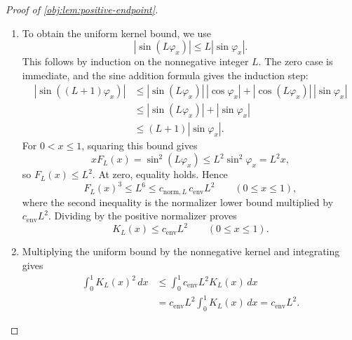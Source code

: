 \documentclass[11pt]{article}
\begin{document}
\begin{proof}[Proof of \cref{obj:lem:positive-endpoint}]
\begin{enumerate}
Define the endpoint-window width by
\[
\delta_{\mathrm{win},L}:=\frac{1}{16L^2}.
\]
For \(0<x\le\delta_{\mathrm{win},L}\), we have
\[
L\sqrt{x}\le\frac14.
\]
Using \(\sin v\ge(2/\pi)v\) for \(0\le v\le\pi/2\) at \(v=\varphi_x\), we obtain
\[
\frac{2}{\pi}L\varphi_x
\le L\sin\varphi_x
=L\sqrt{x}
\le\frac14.
\]
Thus \(0\le L\varphi_x\le\pi/2\), so the same sine inequality applies at \(L\varphi_x\). Together with \(\sin\varphi_x\le\varphi_x\), it yields
\[
\frac{2}{\pi}L\sin\varphi_x
\le\frac{2}{\pi}L\varphi_x
\le\sin(L\varphi_x).
\]
Squaring and using \(xF_L(x)=\sin^2(L\varphi_x)\), then dividing by \(x>0\), gives
\[
F_L(x)\ge\left(\frac{2}{\pi}\right)^2L^2.
\]
At \(x=0\), this inequality follows from \(F_L(0)=L^2\) and \(2/\pi\le1\). Therefore it holds throughout \([0,\delta_{\mathrm{win},L}]\). Since \(F_L^3\) is nonnegative on \([0,1]\),
\[
\begin{aligned}
c_{\mathrm{norm},L}
&\ge
\int_0^{\delta_{\mathrm{win},L}}F_L(t)^3\,dt\\
&\ge
\int_0^{\delta_{\mathrm{win},L}}
\left(\left(\frac{2}{\pi}\right)^2L^2\right)^3\,dt\\
&=
\frac{1}{16L^2}\frac{64L^6}{\pi^6}
=
\frac{4}{\pi^6}L^4.
\end{aligned}
\]

\item To obtain the uniform kernel bound, we use
\[
|\sin(L\varphi_x)|\le L|\sin\varphi_x|.
\]
This follows by induction on the nonnegative integer \(L\). The zero case is immediate, and the sine addition formula gives the induction step:
\[
\begin{aligned}
|\sin((L+1)\varphi_x)|
&\le
|\sin(L\varphi_x)|\,|\cos\varphi_x|
+
|\cos(L\varphi_x)|\,|\sin\varphi_x|\\
&\le
|\sin(L\varphi_x)|+|\sin\varphi_x|\\
&\le
(L+1)|\sin\varphi_x|.
\end{aligned}
\]
For \(0<x\le1\), squaring this bound gives
\[
xF_L(x)=\sin^2(L\varphi_x)
\le L^2\sin^2\varphi_x
=L^2x,
\]
so \(F_L(x)\le L^2\). At zero, equality holds. Hence
\[
F_L(x)^3\le L^6
\le c_{\mathrm{norm},L}\,c_{\mathrm{env}}L^2
\qquad(0\le x\le1),
\]
where the second inequality is the normalizer lower bound multiplied by \(c_{\mathrm{env}}L^2\). Dividing by the positive normalizer proves
\[
K_L(x)\le c_{\mathrm{env}}L^2
\qquad(0\le x\le1).
\]

\item Multiplying the uniform bound by the nonnegative kernel and integrating gives
\[
\begin{aligned}
\int_0^1K_L(x)^2\,dx
&\le
\int_0^1 c_{\mathrm{env}}L^2K_L(x)\,dx\\
&=
c_{\mathrm{env}}L^2\int_0^1K_L(x)\,dx
=
c_{\mathrm{env}}L^2.
\end{aligned}
\]


\end{enumerate}
\end{proof}
\end{document}
